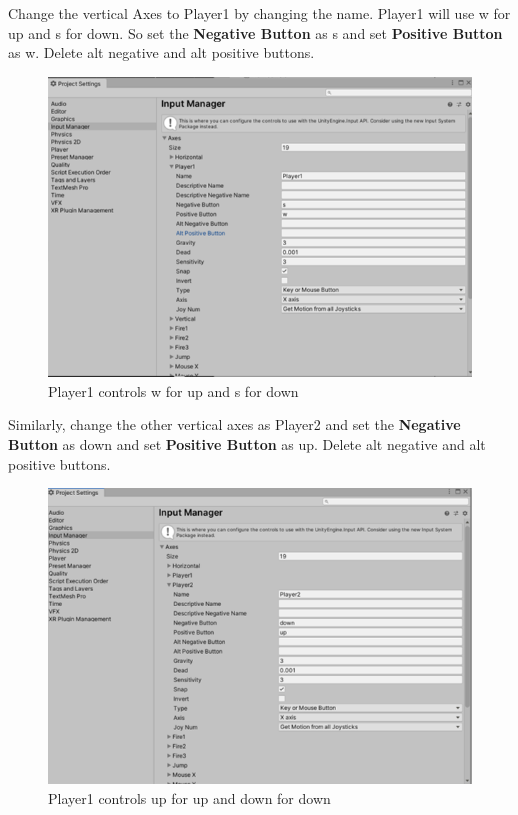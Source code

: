 \documentclass[
]{book}
\begin{document}
Change the vertical Axes to Player1 by changing the name. Player1 will use w for up and s for down. So set the \textbf{Negative Button} as s and set \textbf{Positive Button} as w. Delete alt negative and alt positive buttons.

\begin{figure}
\centering
\includegraphics{Images/Player1controls.png}
\caption{Player1 controls w for up and s for down}
\end{figure}

Similarly, change the other vertical axes as Player2 and set the \textbf{Negative Button} as down and set \textbf{Positive Button} as up. Delete alt negative and alt positive buttons.

\begin{figure}
\centering
\includegraphics{Images/Player2controls.png}
\caption{Player1 controls up for up and down for down}
\end{figure}
\end{document}
